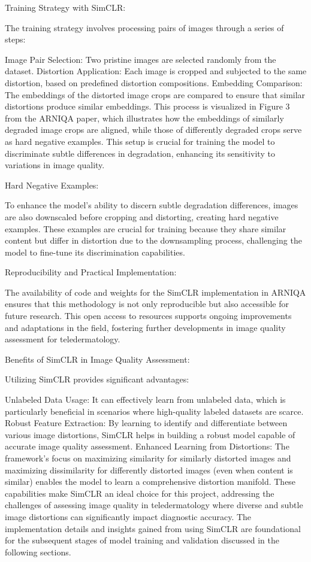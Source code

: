 Training Strategy with SimCLR:

The training strategy involves processing pairs of images through a series of steps:

Image Pair Selection: Two pristine images are selected randomly from the dataset.
Distortion Application: Each image is cropped and subjected to the same distortion, based on predefined distortion compositions.
Embedding Comparison: The embeddings of the distorted image crops are compared to ensure that similar distortions produce similar embeddings.
This process is visualized in Figure 3 from the ARNIQA paper, which illustrates how the embeddings of similarly degraded image crops are aligned, while those of differently degraded crops serve as hard negative examples. This setup is crucial for training the model to discriminate subtle differences in degradation, enhancing its sensitivity to variations in image quality.

Hard Negative Examples:

To enhance the model’s ability to discern subtle degradation differences, images are also downscaled before cropping and distorting, creating hard negative examples. These examples are crucial for training because they share similar content but differ in distortion due to the downsampling process, challenging the model to fine-tune its discrimination capabilities.

Reproducibility and Practical Implementation:

The availability of code and weights for the SimCLR implementation in ARNIQA ensures that this methodology is not only reproducible but also accessible for future research. This open access to resources supports ongoing improvements and adaptations in the field, fostering further developments in image quality assessment for teledermatology.

Benefits of SimCLR in Image Quality Assessment:

Utilizing SimCLR provides significant advantages:

Unlabeled Data Usage: It can effectively learn from unlabeled data, which is particularly beneficial in scenarios where high-quality labeled datasets are scarce.
Robust Feature Extraction: By learning to identify and differentiate between various image distortions, SimCLR helps in building a robust model capable of accurate image quality assessment.
Enhanced Learning from Distortions: The framework’s focus on maximizing similarity for similarly distorted images and maximizing dissimilarity for differently distorted images (even when content is similar) enables the model to learn a comprehensive distortion manifold.
These capabilities make SimCLR an ideal choice for this project, addressing the challenges of assessing image quality in teledermatology where diverse and subtle image distortions can significantly impact diagnostic accuracy. The implementation details and insights gained from using SimCLR are foundational for the subsequent stages of model training and validation discussed in the following sections. \par
\vspace{\baselineskip}
\noindent

